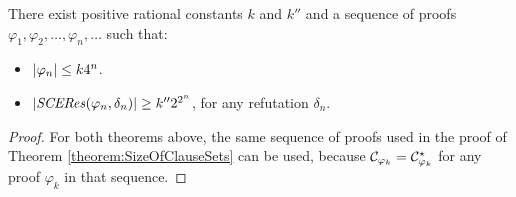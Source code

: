 \begin{theorem}
\label{theorem:SizeOfCEResSwapNormalForms}
There exist positive rational constants $k$ and $k''$ and a sequence of proofs $\varphi_1, \varphi_2, \ldots, \varphi_n, \ldots$ such that:
\begin{itemize}
\item $|\varphi_n| \leq k 4^n$.
\item $|\mathit{SCERes}(\varphi_n,\delta_n)| \geq k'' 2^{2^n}$, for any refutation $\delta_n$.
\end{itemize}
\end{theorem}
\begin{proof}
For both theorems above, the same sequence of proofs used in the proof of 
Theorem \ref{theorem:SizeOfClauseSets} can be used, 
because $\mathcal{C}_{\varphi_k} = \mathcal{C}^{\star}_{\varphi_k}$ for any proof $\varphi_k$ in that sequence.
\end{proof}
